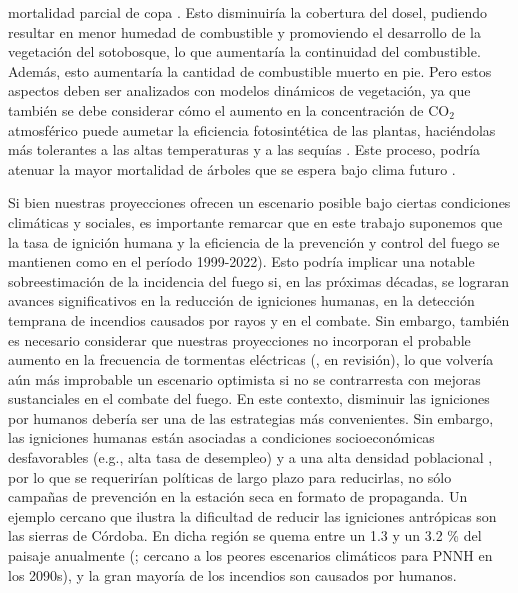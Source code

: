 mortalidad parcial de copa \citep{suarez2004factors,rodriguez2016influence,molowny2017changes}. Esto disminuiría la cobertura del dosel, pudiendo resultar en menor humedad de combustible \citep{barbera_microclimate_2023} y promoviendo el desarrollo de la vegetación del sotobosque, lo que aumentaría la continuidad del combustible. Además, esto aumentaría la cantidad de combustible muerto en pie. Pero estos aspectos deben ser analizados con modelos dinámicos de vegetación, ya que también se debe considerar cómo el aumento en la concentración de $\text{CO}_2$ atmosférico puede aumetar la eficiencia fotosintética de las plantas, haciéndolas más tolerantes a las altas temperaturas y a las sequías \citep{silva2013probing,sperlich2020gains}. Este proceso, podría atenuar la mayor mortalidad de árboles que se espera bajo clima futuro \citep{gutierrez2014increased,sperlich2020gains}.


Si bien nuestras proyecciones ofrecen un escenario posible bajo ciertas condiciones climáticas y sociales, es importante remarcar que en este trabajo suponemos que la tasa de ignición humana y la eficiencia de la prevención y control del fuego se mantienen como en el período 1999-2022). Esto podría implicar una notable sobreestimación de la incidencia del fuego si, en las próximas décadas, se lograran avances significativos en la reducción de igniciones humanas, en la detección temprana de incendios causados por rayos y en el combate. Sin embargo, también es necesario considerar que nuestras proyecciones no incorporan el probable aumento en la frecuencia de tormentas eléctricas (\citeauthor{kitzbergerLightning}, en revisión), lo que volvería aún más improbable un escenario optimista si no se contrarresta con mejoras sustanciales en el combate del fuego. En este contexto, disminuir las igniciones por humanos debería ser una de las estrategias más convenientes. Sin embargo, las igniciones humanas están asociadas a condiciones socioeconómicas desfavorables (e.g., alta tasa de desempleo) y a una alta densidad poblacional \citep{buhler2013demography}, por lo que se requerirían políticas de largo plazo para reducirlas, no sólo campañas de prevención en la estación seca en formato de propaganda. Un ejemplo cercano que ilustra la dificultad de reducir las igniciones antrópicas son las sierras de Córdoba. En dicha región se quema entre un 1.3 y un 3.2 \% del paisaje anualmente (\citealt{arganaraz_incidencia_2020}; cercano a los peores escenarios climáticos para PNNH en los 2090s), y la gran mayoría de los incendios son causados por humanos.

